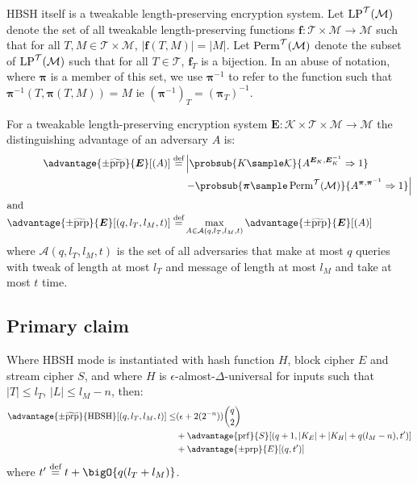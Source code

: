 \documentclass[eprint.tex]{subfiles}
\begin{document}
HBSH itself is a tweakable length-preserving encryption system.
Let $\operatorname{LP}^\mathcal{T}(\mathcal{M})$ denote the set of all
tweakable length-preserving functions
$\bm{f} : \mathcal{T} \times \mathcal{M} \rightarrow \mathcal{M}$
such that for all $T, M \in \mathcal{T} \times \mathcal{M}$,
$|\bm{f}(T, M)| = |M|$. Let $\operatorname{Perm}^\mathcal{T}(\mathcal{M})$ denote
the subset of $\operatorname{LP}^\mathcal{T}(\mathcal{M})$ such that
for all $T \in \mathcal{T}$, $\bm{f}_{T}$ is a bijection.
In an abuse of notation,
where $\bm{\pi}$ is a member of this set,
we use $\bm{\pi}^{-1}$ to refer to the function
such that $\bm{\pi}^{-1}(T, \bm{\pi}(T, M)) = M$ ie $(\bm{\pi}^{-1})_T = (\bm{\pi}_T)^{-1}$.

For a tweakable length-preserving encryption system
$\bm{E} : \mathcal{K} \times \mathcal{T} \times \mathcal{M} \rightarrow \mathcal{M}$
the distinguishing advantage of an adversary $A$ is:
%
\begin{align*}
    \advantage{\pm \widetilde{\mathrm{prp}}}{\bm{E}}[(A)] \defeq
    &\left|\probsub{K \sample \mathcal{K}}{A^{\bm{E}_K,\bm{E}_K^{-1}}\Rightarrow 1}\right.
    \\
    &\left. - \probsub{\bm{\pi} \sample \Perm^\mathcal{T}(\mathcal{M})}
        {A^{\bm{\pi},\bm{\pi}^{-1}}\Rightarrow 1}\right|
    \\
\intertext{and}
\advantage{\pm \widetilde{\mathrm{prp}}}{\bm{E}}[(q, l_T, l_M, t)]
\defeq &
\max_{A \in \mathcal{A}(q, l_T, l_M, t)} \advantage{\pm \widetilde{\mathrm{prp}}}{\bm{E}}[(A)]
\end{align*}
%
\begin{displaymath}
\end{displaymath}
where $\mathcal{A}(q, l_T, l_M, t)$
is the set of all adversaries that
make at most $q$ queries
with tweak of length at most $l_T$
and message of length at most $l_M$
and take at most $t$ time.

\subsection{Primary claim}
\begin{theorem}\label{hbshadvantage}
    Where HBSH mode is instantiated with hash function $H$, block cipher $E$ and stream cipher $S$,
    and where $H$ is $\epsilon$-almost-$\Delta$-universal for inputs such that
    $|T| \leq l_T$, $|L| \leq l_M - n$, then:
    \begin{align*}
        \advantage{\pm \widetilde{\mathrm{prp}}}{\HBSH}[(q, l_T, l_M, t)]
        \leq &(\epsilon + 2(2^{-n}))\binom{q}{2} \\
        &+ \advantage{\mathrm{prf}}{S}[(q + 1, |K_E| + |K_H| + q(l_M - n), t')] \\
        &+ \advantage{\pm \mathrm{prp}}{E}[(q, t')]\\
    \end{align*}
    where $t' \defeq t + \bigO{q(l_T + l_M)}$.
\end{theorem}
\end{document}
